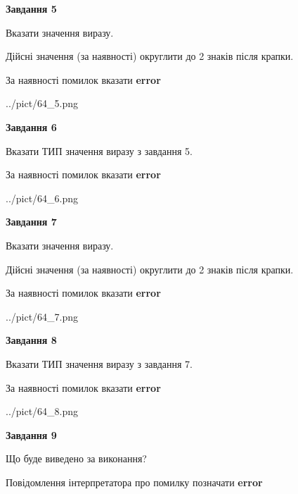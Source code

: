 \documentclass[11pt, ukrainian]{article}
\begin{document}
{\begin {large}
{\begin {center}\textbf{Завдання 5}\end {center}}\par
Вказати значення виразу. \par
Дійсні значення (за наявності) округлити до 2 знаків після крапки. \par
За наявності помилок вказати \textbf{error}

\begin{center}
	{../pict/64_5.png}
\end{center}
\newpage

{\begin {center}\textbf{Завдання 6}\end {center}}\par
Вказати ТИП значення виразу з завдання 5. \par
За наявності помилок вказати \textbf{error}

\begin{center}
	{../pict/64_6.png}
\end{center}
\newpage

{\begin {center}\textbf{Завдання 7}\end {center}}\par
Вказати значення виразу. \par
Дійсні значення (за наявності) округлити до 2 знаків після крапки. \par
За наявності помилок вказати \textbf{error}

\begin{center}
	{../pict/64_7.png}
\end{center}
\newpage

{\begin {center}\textbf{Завдання 8}\end {center}}\par
Вказати ТИП значення виразу з завдання 7. \par
За наявності помилок вказати \textbf{error}

\begin{center}
	{../pict/64_8.png}
\end{center}
\newpage

{\begin {center}\textbf{Завдання 9}\end {center}}\par
Що буде виведено за виконання? \par
Повідомлення інтерпретатора про помилку позначати \textbf{error}


\end{large}}
\end{document}
